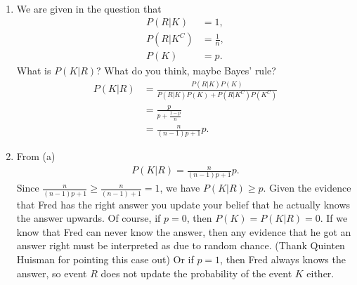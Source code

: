 
\begin{exercise}[BH.2.4]
\setcounter{theorem}{3}
\begin{solution}~
	\begin{enumerate}
		\item We are given in the question that
		\begin{align*}
			P(R|K) &= 1,\\
			P(R|K^{C})&=\frac{1}{n},\\
			P(K) &= p.
		\end{align*}
		What is $P(K|R)$? What do you think, maybe Bayes' rule?
		\begin{align*}
			P(K|R)& = \frac{P(R|K)P(K)}{P(R|K)P(K)+P(R|K^{C})P(K^{C})}\\
			&=\frac{p}{p + \frac{1-p}{n}}\\
			& = \frac{n}{(n-1)p+1}p.
		\end{align*}
		\item  From (a)
		\begin{align*}
			P(K|R) = \frac{n}{(n-1)p+1}p.
		\end{align*}
		Since $\frac{n}{(n-1)p+1}\geq \frac{n}{(n-1)+1} = 1$, we have $P(K|R)\geq p$. Given the evidence that Fred has the right answer you update your belief that he actually knows the answer upwards. Of course, if $p=0$, then $P(K)=P(K|R)=0$. If we know that Fred can never know the answer, then any evidence that he got an answer right must be interpreted as due to random chance. (Thank Quinten Huisman for pointing this case out) Or if $p=1$, then Fred always knows the answer, so event $R$ does not update the probability of the event $K$ either. 
	\end{enumerate}
\end{solution}
\end{exercise}

